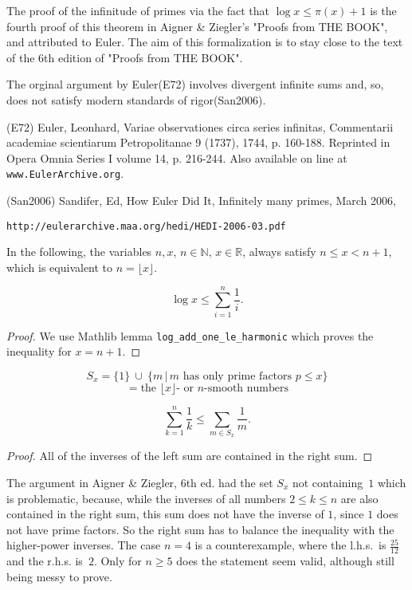 The proof of the infinitude of primes via the fact that $\log x\le \pi(x)+1$ is the fourth proof of this theorem in Aigner \& Ziegler's "Proofs from THE BOOK", and attributed to Euler. The aim of this formalization is to stay close to the text of the 6th edition of "Proofs from THE BOOK".

The orginal argument by Euler(E72) involves divergent infinite sums and, so, does not satisfy
modern standards of rigor(San2006).

(E72)
Euler, Leonhard, Variae observationes circa series infinitas, Commentarii academiae scientiarum
Petropolitanae 9 (1737), 1744, p. 160-188. Reprinted in Opera Omnia Series I volume 14, p. 216-244.
Also available on line at \verb|www.EulerArchive.org|. 

(San2006)
Sandifer, Ed, How Euler Did It, Infinitely many primes, March 2006, \begin{verbatim}http://eulerarchive.maa.org/hedi/HEDI-2006-03.pdf\end{verbatim}

\begin{definition}
\label{def:nx}
In the following, the variables $n,x$, $n\in\mathbb{N}$, $x\in\mathbb{R}$, always satisfy
$n\le x < n+1$, which is equivalent to $n=\lfloor x\rfloor$. 
\end{definition}

\begin{lemma}
\label{lem:lemma0}
\leanok
$$\log x \le \sum_{i=1}^n\frac1i.$$
\end{lemma}
\begin{proof}
\leanok
    We use Mathlib lemma \verb|log_add_one_le_harmonic| which proves the inequality for $x=n+1$. 
\end{proof}

\begin{definition}
\label{def:S}
\leanok
    $$ S_x = \{1\}\ \cup\ \{m\,\big|\, \text{$m$ has only prime factors $p\le x$}\} $$
    $$ = \text{the $\lfloor x\rfloor$- or $n$-smooth numbers} $$
\end{definition}

\begin{lemma}
\label{lem:lemma1}
\leanok
    $$\sum_{k=1}^n\frac1k \le \sum_{m\in S_x}\frac{1}{m}. $$
\end{lemma}
\begin{proof}
All of the inverses of the left sum are contained in the right sum.
\end{proof}
The argument in Aigner \& Ziegler, 6th ed. had the set $S_x$ not containing~$1$ which
is problematic, because, while the inverses of all numbers $2\le k \le n$ are also contained
in the right sum, this sum does not have the inverse of $1$, since $1$ does not have prime factors.
So the right
sum has to balance the inequality with the higher-power inverses. The case $n=4$ is a counterexample,
where the l.h.s.~is $\tfrac{25}{12}$ and the r.h.s. is~$2$. Only for $n\ge5$ does the statement seem valid,
although still being messy to prove.


